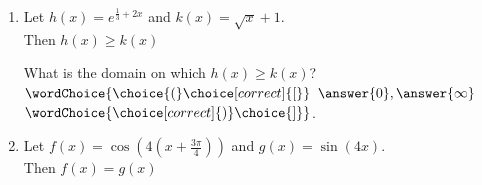 \documentclass{ximera}
\begin{document}
\begin{exercise}
\begin{enumerate}
\item Let $h(x) = e^{\frac{1}{3} + 2x}$ and $k(x) =\sqrt{x}+1$. \\
Then $h(x) \geq k(x)$ 
\begin{multipleChoice}
\end{multipleChoice}
\begin{exercise}
What is the domain on which $h(x) \geq k(x)$?\\
$\wordChoice{\choice{(}\choice[correct]{[}}$ $\answer{0} , \answer{\infty}$ 
$\wordChoice{\choice[correct]{)}\choice{]}}$.
\end{exercise}

\item Let $f(x) = \cos\!\left(4\left(x+\frac{3\pi}{4}\right)\right)$ and $g(x) = \sin(4x)$. \\
Then $f(x)= g(x)$ 
\begin{multipleChoice}
\end{multipleChoice}


\end{enumerate}

\end{exercise}
\end{document}
